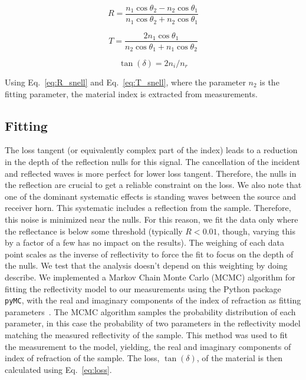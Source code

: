 \begin{equation}
    R = \frac{n_1 \cos\theta_2 - n_2\cos\theta_1}{n_1\cos\theta_2 + n_2\cos\theta_1}
    \label{eq:R_snell}
\end{equation}

\begin{equation}
    T = \frac{2 n_1 \cos\theta_1}{n_2\cos\theta_1 + n_1\cos\theta_2}
    \label{eq:T_snell}
\end{equation}

\begin{equation}
    \tan(\delta) = 2n_i/n_r
    \label{eq:loss}
\end{equation}

Using Eq.~\ref{eq:R_snell} and Eq.~\ref{eq:T_snell}, where the parameter $n_2$ is the fitting parameter, the material index is extracted from measurements. 

\subsection{Fitting}
The loss tangent (or equivalently complex part of the index) leads to a reduction in the depth of the reflection nulls for this signal. The cancellation of the incident and reflected waves is more perfect for lower loss tangent. Therefore, the nulls in the reflection are crucial to get a reliable constraint on the loss. We also note that one of the dominant systematic effects is standing waves between the source and receiver horn. This systematic includes a reflection from the sample. Therefore, this noise is minimized near the nulls. For this reason, we fit the data only where the reflectance is below some threshold (typically $R<0.01$, though, varying this by a factor of a few has no impact on the results). The weighing of each data point scales as the inverse of reflectivity to force the fit to focus on the depth of the nulls. We test that the analysis doesn’t depend on this weighting by doing describe. We implemented a Markov Chain Monte Carlo (MCMC) algorithm for fitting the reflectivity model to our measurements using the Python package \verb|pyMC|, with the real and imaginary components of the index of refraction as fitting parameters~\cite{Patil2010PyMCBS}. The MCMC algorithm samples the probability distribution of each parameter, in this case the probability of two parameters in the reflectivity model matching the measured reflectivity of the sample. This method was used to fit the measurement to the model, yielding, the real and imaginary components of index of refraction of the sample. The loss, $\tan(\delta)$, of the material is then calculated using Eq.~\ref{eq:loss}.

